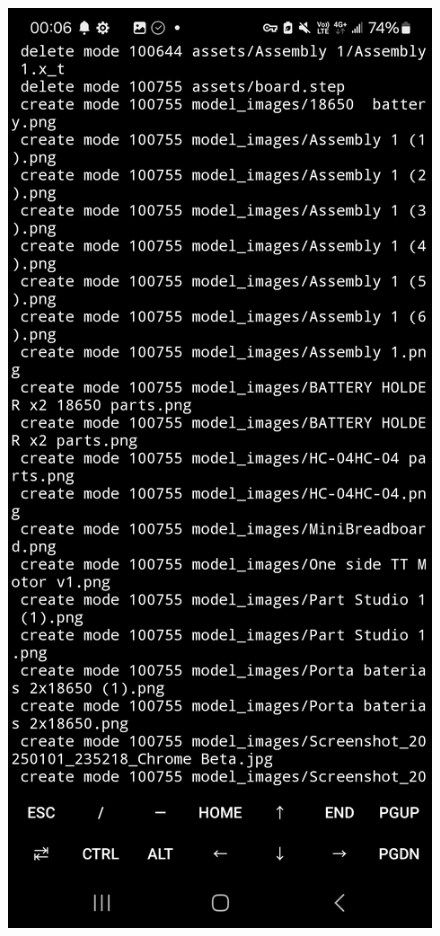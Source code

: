 \documentclass[a4paper,12pt]{./article}
\begin{document}
\begin{center}
\begin{figure}[H]
\begin{minipage}[t]{./0.45\textwidth}
\end{minipage}
\hfill
\begin{minipage}[t]{./0.45\textwidth}
\centering
\includegraphics[width=\textwidth]{./working_screenshots/2.jpg}
\end{minipage}
\hfill
\end{figure}\FloatBarrier\end{center}
\end{document}
